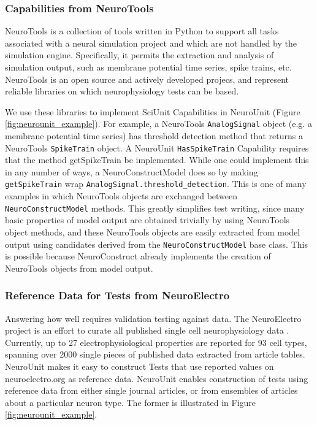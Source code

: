 \documentclass[11pt,letterpaper]{article}
\begin{document}
\subsubsection{Capabilities from NeuroTools}
NeuroTools \cite{neuralensemble_url} is a collection of tools written in Python to support all tasks associated with a neural simulation project and which are not handled by the simulation engine.  Specifically, it permits the extraction and analysis of simulation output, such as membrane potential time series, spike trains, etc. NeuroTools is an open source and actively developed projecs, and represent reliable libraries on which neurophysiology tests can be based. 

We use these libraries to implement SciUnit Capabilities in NeuroUnit (Figure \ref{fig:neurounit_example}).  For example, a NeuroTools \verb|AnalogSignal| object (e.g. a membrane potential time series) has threshold detection method that returns a NeuroTools \verb|SpikeTrain| object.  A NeuroUnit \verb|HasSpikeTrain| Capability requires that the method getSpikeTrain be implemented.  While one could implement this in any number of ways, a NeuroConstructModel does so by making \verb|getSpikeTrain| wrap \verb|AnalogSignal.threshold_detection|.  This is one of many examples in which NeuroTools objects are exchanged between \verb|NeuroConstructModel| methods.  This greatly simplifies test writing, since many basic properties of model output are obtained trivially by using NeuroTools object methods, and these NeuroTools objects are easily extracted from model output using candidates derived from the \verb|NeuroConstructModel| base class.  This is possible because NeuroConstruct already implements the creation of NeuroTools objects from model output.  

\subsubsection{Reference Data for Tests from NeuroElectro}
Answering how well requires validation testing against data. The NeuroElectro project \cite{neuroelectro_url} is an effort to curate all published single cell neurophysiology data \cite{tripathy_neuroelectro:_2012}.  Currently, up to 27 electrophysiological properties are reported for 93 cell types, spanning over 2000 single pieces of published data extracted from article tables.  NeuroUnit makes it easy to construct Tests that use reported values on neuroelectro.org as reference data.  NeuroUnit enables construction of tests using reference data from either single journal articles, or from ensembles of articles about a particular neuron type.  The former is illustrated in Figure \ref{fig:neurounit_example}.
\end{document}
